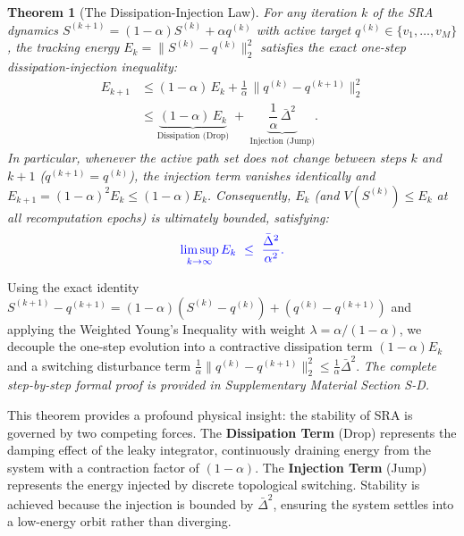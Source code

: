 \documentclass[journal]{IEEEtran}
\theoremstyle{plain}
\newtheorem{theorem}{Theorem}
\theoremstyle{definition}
\newcommand{\rev}[1]{{\color{blue}#1}}
\begin{document}
\begin{theorem}[The Dissipation-Injection Law]
\label{thm:drop_jump}
\rev{For any iteration $k$ of the SRA dynamics $S^{(k+1)} = (1-\alpha)S^{(k)} + \alpha q^{(k)}$ with active target $q^{(k)} \in \{v_1, \dots, v_M\}$, the tracking energy $E_k = \|S^{(k)} - q^{(k)}\|_2^2$ satisfies the exact one-step dissipation-injection inequality:
\begin{equation}\label{eq:drop_jump_one_step}
\begin{aligned}
E_{k+1} &\le (1-\alpha)\,E_k + \frac{1}{\alpha}\,\|q^{(k)} - q^{(k+1)}\|_2^2 \\
&\le \underbrace{(1-\alpha)\,E_k}_{\text{Dissipation (Drop)}}\ +\ \underbrace{\dfrac{1}{\alpha}\,\bar\Delta^{2}}_{\text{Injection (Jump)}}.
\end{aligned}
\end{equation}
In particular, whenever the active path set does not change between steps $k$ and $k+1$ ($q^{(k+1)} = q^{(k)}$), the injection term vanishes identically and $E_{k+1} = (1-\alpha)^2 E_k \le (1-\alpha) E_k$. Consequently, $E_k$ (and $V(S^{(k)}) \le E_k$ at all recomputation epochs) is ultimately bounded, satisfying:}
\begin{equation}\label{eq:limsup_boundedness}
\rev{\limsup_{k\to\infty} E_k\ \le\ \frac{\bar\Delta^{2}}{\alpha^2}.}
\end{equation}
\end{theorem}
\begin{IEEEproof}
Using the exact identity $S^{(k+1)} - q^{(k+1)} = (1-\alpha)(S^{(k)} - q^{(k)}) + (q^{(k)} - q^{(k+1)})$ and applying the Weighted Young's Inequality with weight $\lambda = \alpha/(1-\alpha)$, we decouple the one-step evolution into a contractive dissipation term $(1-\alpha)E_k$ and a switching disturbance term $\frac{1}{\alpha}\|q^{(k)} - q^{(k+1)}\|_2^2 \le \frac{1}{\alpha}\bar{\Delta}^2$. \textit{The complete step-by-step formal proof is provided in Supplementary Material Section S-D.}
\end{IEEEproof}

This theorem provides a profound physical insight: the stability of SRA is governed by two competing forces. 
The \textbf{Dissipation Term} (Drop) represents the damping effect of the leaky integrator, continuously draining energy from the system with a contraction factor of $(1-\alpha)$. 
The \textbf{Injection Term} (Jump) represents the energy injected by discrete topological switching. 
Stability is achieved because the injection is bounded by $\bar{\Delta}^2$, ensuring the system settles into a low-energy orbit rather than diverging.
\end{document}
